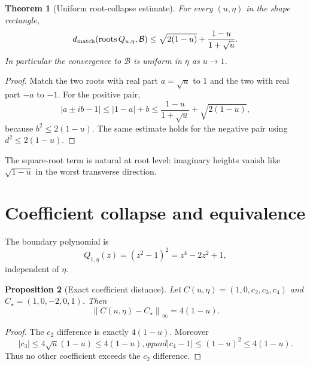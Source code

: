\documentclass[12pt]{article}
\newtheorem{theorem}{Theorem}[section]\newtheorem{proposition}[theorem]{Proposition}
\theoremstyle{remark}\newtheorem{remark}[theorem]{Remark}
\newcommand{\norm}[1]{\left\lVert#1\right\rVert}
\begin{document}
\begin{theorem}[Uniform root-collapse estimate]\label{thm:collapse}
For every $(u,\eta)$ in the shape rectangle,
\begin{equation}\label{eq:rootbound}
 d_{\rm match}(\operatorname{roots}Q_{u,\eta},\mathcal B)
 \le \sqrt{2(1-u)}+\frac{1-u}{1+\sqrt u}.
\end{equation}
In particular the convergence to $\mathcal B$ is uniform in $\eta$ as
$u\to1$.
\end{theorem}
\begin{proof}
Match the two roots with real part $a=\sqrt u$ to $1$ and the two with real
part $-a$ to $-1$.  For the positive pair,
\begin{equation}
 |a\pm ib-1|\le |1-a|+b
 \le \frac{1-u}{1+\sqrt u}+\sqrt{2(1-u)},
\end{equation}
because $b^2\le2(1-u)$.  The same estimate holds for the negative pair using
$d^2\le2(1-u)$.
\end{proof}

The square-root term is natural at root level: imaginary heights vanish like
$\sqrt{1-u}$ in the worst transverse direction.

\section{Coefficient collapse and equivalence}

The boundary polynomial is
\begin{equation}
 Q_{1,\eta}(z)=(z^2-1)^2=z^4-2z^2+1,
\end{equation}
independent of $\eta$.

\begin{proposition}[Exact coefficient distance]\label{prop:coeffdistance}
Let $C(u,\eta)=(1,0,c_2,c_3,c_4)$ and
$C_\star=(1,0,-2,0,1)$.  Then
\begin{equation}\label{eq:coeffdistance}
 \norm{C(u,\eta)-C_\star}_\infty=4(1-u).
\end{equation}
\end{proposition}
\begin{proof}
The $c_2$ difference is exactly $4(1-u)$.  Moreover
\begin{equation}
 |c_3|\le4\sqrt u(1-u)\le4(1-u),qquad
 |c_4-1|\le(1-u)^2\le4(1-u).
\end{equation}
Thus no other coefficient exceeds the $c_2$ difference.
\end{proof}
\end{document}
